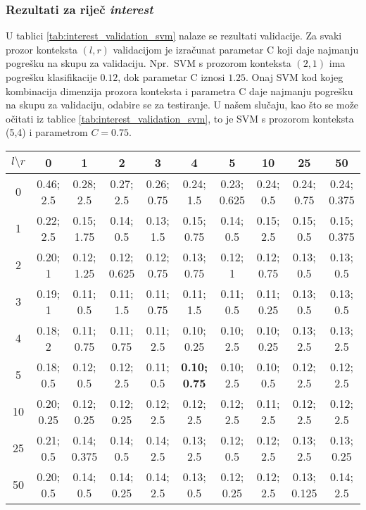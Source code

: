 \documentclass[10pt, a4paper]{article}
\begin{document}
\subsubsection{Rezultati za riječ \emph{interest}}
U tablici \ref{tab:interest_validation_svm} nalaze se rezultati validacije.
Za svaki prozor konteksta $(l,r)$ validacijom je izračunat parametar C koji
daje najmanju pogrešku na skupu za validaciju.
Npr.~SVM s prozorom konteksta $(2,1)$ ima pogrešku klasifikacije $0.12$,
dok parametar C iznosi $1.25$. 
Onaj SVM kod kojeg kombinacija dimenzija prozora konteksta i parametra C daje najmanju pogrešku na skupu za validaciju, odabire se za testiranje.
U našem slučaju, kao što se može očitati iz tablice \ref{tab:interest_validation_svm}, to je SVM s prozorom konteksta (5,4) i parametrom $C=0.75$.
\begin{table*}[!hbtp]
\caption{Pogreške i vrijednosti parametara C nakon provedene validacije SVM-a za riječ \emph{interest}}
\label{tab:interest_validation_svm}
\begin{center}
\begin{tabular}{|c|ccccccccc|}
\hline
$l \setminus r$ & 0 & 1 & 2 & 3 & 4 & 5 & 10 & 25 & 50 \\
\hline
0 & 0.46; 2.5 & 0.28; 2.5 & 0.27; 2.5 & 0.26; 0.75 & 0.24; 1.5 & 0.23; 0.625 & 0.24; 0.5 & 0.24; 0.75 & 0.24; 0.375 \\
1 & 0.22; 2.5 & 0.15; 1.75 & 0.14; 0.5 & 0.13; 1.5 & 0.15; 0.75 & 0.14; 0.5 & 0.15; 2.5 & 0.15; 0.5 & 0.15; 0.375 \\
2 & 0.20; 1 & 0.12; 1.25 & 0.12; 0.625 & 0.12; 0.75 & 0.13; 0.75 & 0.12; 1 & 0.12; 0.75 & 0.13; 0.5 & 0.13; 0.5 \\
3 & 0.19; 1 & 0.11; 0.5 & 0.11; 1.5 & 0.11; 0.75 & 0.11; 1.5 & 0.11; 0.5 & 0.11; 0.25 & 0.13; 0.5 & 0.13; 0.5 \\
4 & 0.18; 2 & 0.11; 0.75 & 0.11; 0.75 & 0.11; 2.5 & 0.10; 0.25 & 0.10; 2.5 & 0.10; 0.25 & 0.13; 2.5 & 0.13; 2.5 \\
5 & 0.18; 0.5 & 0.12; 0.5 & 0.12; 2.5 & 0.11; 0.5 & \textbf{0.10; 0.75} & 0.10; 2.5 & 0.10; 0.5 & 0.12; 2.5 & 0.12; 2.5 \\
10 & 0.20; 0.25 & 0.12; 0.25 & 0.12; 0.25 & 0.12; 2.5 & 0.12; 2.5 & 0.12; 2.5 & 0.11; 2.5 & 0.12; 2.5 & 0.12; 2.5 \\
25 & 0.21; 0.5 & 0.14; 0.375 & 0.14; 0.5 & 0.14; 2.5 & 0.13; 2.5 & 0.12; 0.5 & 0.12; 2.5 & 0.13; 2.5 & 0.13; 0.25 \\
50 & 0.20; 0.5 & 0.14; 0.5 & 0.14; 0.25 & 0.14; 2.5 & 0.13; 0.5 & 0.12; 0.25 & 0.12; 2.5 & 0.13; 0.125 & 0.14; 2.5 \\
\hline
\end{tabular}
\end{center}
\end{table*}
\end{document}

